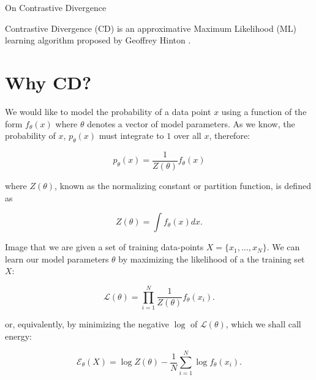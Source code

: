 \documentclass[11pt]{article}
\begin{document}
\begin{center}
{\huge On Contrastive Divergence} 
\end{center}

Contrastive Divergence (CD) is an approximative Maximum Likelihood (ML) learning algorithm proposed by Geoffrey Hinton \cite{Hinton:2002, carreiraperpinan:2005}.


\section{Why CD?}

We would like to model the probability of a data point $x$ using a function of the form $f_\theta(x)$ where $\theta$ denotes a vector of model parameters. As we know, the probability of $x$, $p_\theta(x)$ must integrate to $1$ over all $x$, therefore:

\begin{equation}
p_\theta(x) = \frac{1}{Z(\theta)}f_\theta(x)
\end{equation}

where $Z(\theta)$, known as the normalizing constant or partition function, is defined as

\begin{equation}
Z(\theta) = \int f_\theta(x) dx.
\label{eq:partition}
\end{equation}

Image that we are given a set of training data-points $X=\{x_1,\ldots,x_N\}$. We can learn our model parameters $\theta$ by maximizing the likelihood of a the training set $X$:

\begin{equation}
\mathcal{L} (\theta) = \prod_{i=1}^N \frac{1}{Z(\theta)} f_\theta(x_i).
\end{equation}

or, equivalently, by minimizing the negative $\log$ of $\mathcal{L}(\theta)$, which we shall call energy:

\begin{equation}
\mathcal{E}_\theta(X) = \log Z(\theta) - \frac{1}{N} \sum_{i=1}^N \log f_\theta(x_i).
\label{eq:energy}
\end{equation}
\end{document}
